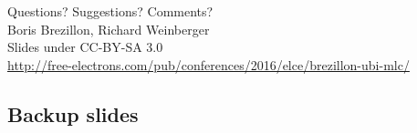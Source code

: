 \documentclass[aspectratio=169,obeyspaces,spaces,hyphens,dvipsnames]{beamer}
\begin{document}
\begin{frame}
  \begin{center}
  \Huge
  Questions? Suggestions? Comments?\\
  \vspace{1.5cm}
  \huge
  Boris Brezillon, Richard Weinberger\\
  \large
  \vspace{0.5cm}
  \vspace{0.5cm}
  \newline Slides under CC-BY-SA 3.0\\
  \scriptsize
  \url{http://free-electrons.com/pub/conferences/2016/elce/brezillon-ubi-mlc/}
  \end{center}
\end{frame}

\subsection{Backup slides}
\end{document}
